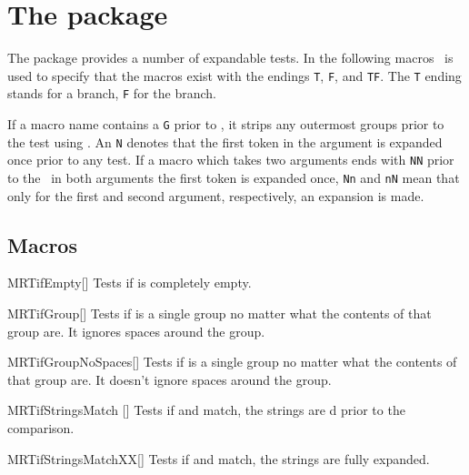 \chapter{The  package}
The  package provides a number of expandable tests. In the following
macros \tfarg\ is used to specify that the macros exist with the endings
\texttt{T}, \texttt{F}, and \texttt{TF}. The \texttt{T} ending stands for a
 branch, \texttt{F} for the  branch.

If a macro name contains a \texttt{G} prior to \tfarg, it strips any outermost
groups prior to the test using . An \texttt{N} denotes that the
first token in the argument is expanded once prior to any test. If a macro which
takes two arguments ends with \texttt{NN} prior to the \tfarg\ in both arguments
the first token is expanded once, \texttt{Nn} and \texttt{nN} mean that only for
the first and second argument, respectively, an expansion is made.

\section{Macros}
\begin{describemacroTF}[G,N,GN]{MRTifEmpty}[]
  Tests if  is completely empty.
\end{describemacroTF}

\begin{describemacroTF}[N]{MRTifGroup}[]
  Tests if  is a single group no matter what the contents of that
  group are. It ignores spaces around the group.
\end{describemacroTF}

\begin{describemacroTF}[N]{MRTifGroupNoSpaces}[]
  Tests if  is a single group no matter what the contents of that
  group are. It doesn't ignore spaces around the group.
\end{describemacroTF}

\begin{describemacroTF}{MRTifStringsMatch}%
  []
  Tests if  and  match, the strings are
  d prior to the comparison.
\end{describemacroTF}

\begin{describemacroTF}[G]{MRTifStringsMatchXX}[]
  Tests if  and  match, the strings are fully
  expanded.
\end{describemacroTF}

